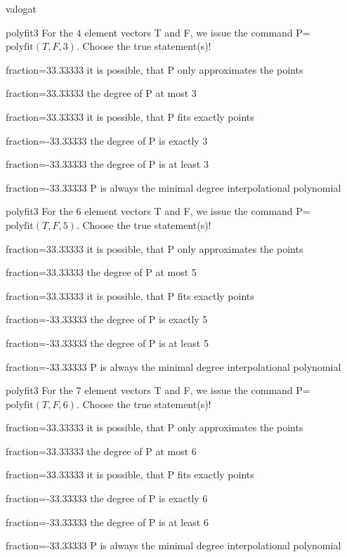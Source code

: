 \documentclass[12pt]{article}
\begin{document}
\begin{quiz}{valogat}
\begin{multi}[single=false]{polyfit3}
For the $4$ element vectors T and F, we issue the command P=$\mathrm{polyfit}(T,F,3)$.
Choose the true statement(s)!
\item[fraction=33.33333] it is possible, that P only approximates the points
\item[fraction=33.33333] the degree of P at most 3
\item[fraction=33.33333] it is possible, that P fits exactly points
\item[fraction=-33.33333]  the degree of P is exactly 3
\item[fraction=-33.33333]  the degree of P is at least 3
\item[fraction=-33.33333]  P is always the minimal degree interpolational polynomial
\end{multi}
\begin{multi}[single=false]{polyfit3}
For the $6$ element vectors T and F, we issue the command P=$\mathrm{polyfit}(T,F,5)$.
Choose the true statement(s)!
\item[fraction=33.33333] it is possible, that P only approximates the points
\item[fraction=33.33333] the degree of P at most 5
\item[fraction=33.33333] it is possible, that P fits exactly points
\item[fraction=-33.33333]  the degree of P is exactly 5
\item[fraction=-33.33333]  the degree of P is at least 5
\item[fraction=-33.33333]  P is always the minimal degree interpolational polynomial
\end{multi}
\begin{multi}[single=false]{polyfit3}
For the $7$ element vectors T and F, we issue the command P=$\mathrm{polyfit}(T,F,6)$.
Choose the true statement(s)!
\item[fraction=33.33333] it is possible, that P only approximates the points
\item[fraction=33.33333] the degree of P at most 6
\item[fraction=33.33333] it is possible, that P fits exactly points
\item[fraction=-33.33333]  the degree of P is exactly 6
\item[fraction=-33.33333]  the degree of P is at least 6
\item[fraction=-33.33333]  P is always the minimal degree interpolational polynomial

\end{multi}
\end{quiz}
\end{document}
